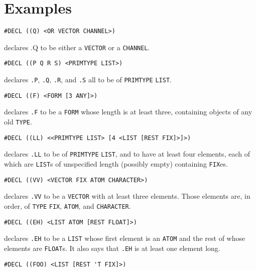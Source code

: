 \documentclass[a4paper]{scrbook}
\begin{document}
\section{Examples}\label{examples-3}

\begin{verbatim}
#DECL ((Q) <OR VECTOR CHANNEL>)
\end{verbatim}

declares .Q to be either a \texttt{VECTOR} or a \texttt{CHANNEL}.

\begin{verbatim}
#DECL ((P Q R S) <PRIMTYPE LIST>)
\end{verbatim}

declares \texttt{.P}, \texttt{.Q}, \texttt{.R}, and \texttt{.S} all to be of \texttt{PRIMTYPE} \texttt{LIST}.

\begin{verbatim}
#DECL ((F) <FORM [3 ANY]>)
\end{verbatim}

declares \texttt{.F} to be a \texttt{FORM} whose length is at least three, containing objects of any old \texttt{TYPE}.

\begin{verbatim}
#DECL ((LL) <<PRIMTYPE LIST> [4 <LIST [REST FIX]>]>)
\end{verbatim}

declares \texttt{.LL} to be of \texttt{PRIMTYPE} \texttt{LIST}, and to have at least four elements, each of which are
\texttt{LIST}s of unspecified length (possibly empty) containing \texttt{FIX}es.

\begin{verbatim}
#DECL ((VV) <VECTOR FIX ATOM CHARACTER>)
\end{verbatim}

declares \texttt{.VV} to be a \texttt{VECTOR} with at least three elements. Those elements are, in order, of \texttt{TYPE}
\texttt{FIX}, \texttt{ATOM}, and \texttt{CHARACTER}.

\begin{verbatim}
#DECL ((EH) <LIST ATOM [REST FLOAT]>)
\end{verbatim}

declares \texttt{.EH} to be a \texttt{LIST} whose first element is an \texttt{ATOM} and the rest of whose elements are
\texttt{FLOAT}s. It also says that \texttt{.EH} is at least one element long.

\begin{verbatim}
#DECL ((FOO) <LIST [REST 'T FIX]>)
\end{verbatim}
\end{document}
